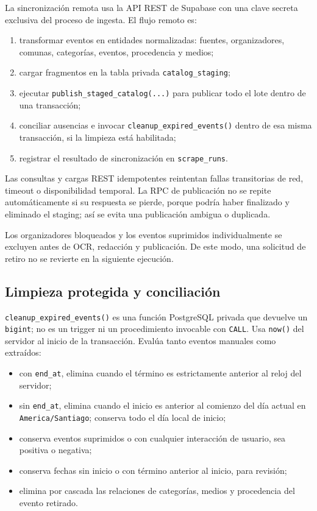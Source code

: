 \documentclass[11pt,a4paper]{article}
\begin{document}
La sincronizaci\'{o}n remota usa la API REST de Supabase con una clave secreta exclusiva del proceso de ingesta. El flujo remoto es:
\begin{enumerate}
  \item transformar eventos en entidades normalizadas: fuentes, organizadores, comunas, categor\'{i}as, eventos, procedencia y medios;
  \item cargar fragmentos en la tabla privada \texttt{catalog\_staging};
  \item ejecutar \texttt{publish\_staged\_catalog(...)} para publicar todo el lote dentro de una transacci\'{o}n;
  \item conciliar ausencias e invocar \texttt{cleanup\_expired\_events()} dentro de esa misma transacci\'{o}n, si la limpieza est\'{a} habilitada;
  \item registrar el resultado de sincronizaci\'{o}n en \texttt{scrape\_runs}.
\end{enumerate}

Las consultas y cargas REST idempotentes reintentan fallas transitorias de red, timeout o disponibilidad temporal. La RPC de publicaci\'{o}n no se repite autom\'{a}ticamente si su respuesta se pierde, porque podr\'{i}a haber finalizado y eliminado el staging; as\'{i} se evita una publicaci\'{o}n ambigua o duplicada.

Los organizadores bloqueados y los eventos suprimidos individualmente se excluyen antes de OCR, redacci\'{o}n y publicaci\'{o}n. De este modo, una solicitud de retiro no se revierte en la siguiente ejecuci\'{o}n.

\subsection{Limpieza protegida y conciliaci\'{o}n}

\texttt{cleanup\_expired\_events()} es una funci\'{o}n PostgreSQL privada que devuelve un \texttt{bigint}; no es un trigger ni un procedimiento invocable con \texttt{CALL}. Usa \texttt{now()} del servidor al inicio de la transacci\'{o}n. Eval\'{u}a tanto eventos manuales como extra\'{i}dos:
\begin{itemize}
  \item con \texttt{end\_at}, elimina cuando el t\'{e}rmino es estrictamente anterior al reloj del servidor;
  \item sin \texttt{end\_at}, elimina cuando el inicio es anterior al comienzo del d\'{i}a actual en \texttt{America/Santiago}; conserva todo el d\'{i}a local de inicio;
  \item conserva eventos suprimidos o con cualquier interacci\'{o}n de usuario, sea positiva o negativa;
  \item conserva fechas sin inicio o con t\'{e}rmino anterior al inicio, para revisi\'{o}n;
  \item elimina por cascada las relaciones de categor\'{i}as, medios y procedencia del evento retirado.
\end{itemize}
\end{document}
